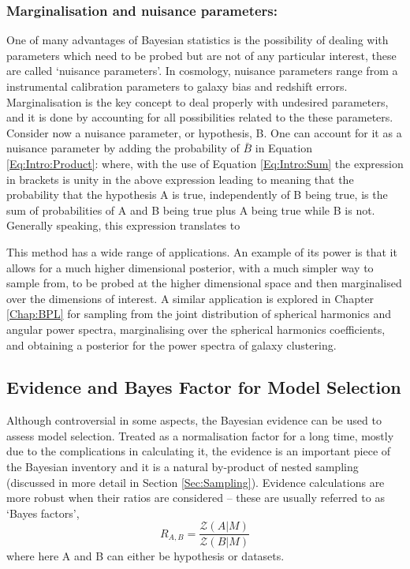 \subsubsection{Marginalisation and nuisance parameters:}
One of many advantages of Bayesian statistics is the possibility of dealing with parameters which need to be probed but are not of any particular interest, these are called `nuisance parameters'. In cosmology, nuisance parameters range from a instrumental calibration parameters to galaxy bias and redshift errors. Marginalisation is the key concept to deal properly with undesired parameters, and it is done by accounting for all possibilities related to the these parameters. Consider now a nuisance parameter, or hypothesis, B. One can account for it as a nuisance parameter by adding the probability of $\bar{B}$ in Equation \eqref{Eq:Intro:Product}:
where, with the use of Equation \eqref{Eq:Intro:Sum} the expression in brackets is unity in the above expression leading to
meaning that the probability that the hypothesis A is true, independently of B being true, is the sum of probabilities of A and B being true plus A being true while B is not. Generally speaking, this expression translates to

\qquad This method has a wide range of applications. An example of its power is that it allows for a much higher dimensional posterior, with a much simpler way to sample from, to be probed at the higher dimensional space and then marginalised over the dimensions of interest. A similar application is explored in Chapter \ref{Chap:BPL} for sampling from the joint distribution of spherical harmonics and angular power spectra, marginalising over the spherical harmonics coefficients, and obtaining a posterior for the power spectra of galaxy clustering.

\subsection{Evidence and Bayes Factor for Model Selection}
Although controversial in some aspects, the Bayesian evidence can be used to assess model selection. Treated as a normalisation factor for a long time, mostly due to the complications in calculating it, the evidence is an important piece of the Bayesian inventory and it is a natural by-product of nested sampling (discussed in more detail in Section \ref{Sec:Sampling}). Evidence calculations are more robust when their ratios are considered -- these are usually referred to as `Bayes factors',
\begin{equation}
R_{A,B} = \frac{\mathcal{Z}(A|M)}{\mathcal{Z}(B|M)}
\label{Eq:Intro:BayesFactor}
\end{equation}
where here A and B can either be hypothesis or datasets. 

